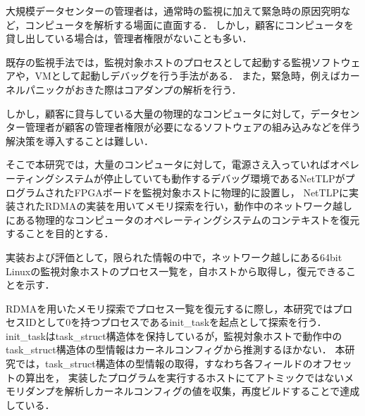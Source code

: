 \begin{jabstract}

大規模データセンターの管理者は，通常時の監視に加えて緊急時の原因究明など，コンピュータを解析する場面に直面する．
しかし，顧客にコンピュータを貸し出している場合は，管理者権限がないことも多い．

既存の監視手法では，監視対象ホストのプロセスとして起動する監視ソフトウェアや，VMとして起動しデバッグを行う手法がある．
また，緊急時，例えばカーネルパニックがおきた際はコアダンプの解析を行う．

しかし，顧客に貸与している大量の物理的なコンピュータに対して，データセンター管理者が顧客の管理者権限が必要になるソフトウェアの組み込みなどを伴う解決策を導入することは難しい．

そこで本研究では，大量のコンピュータに対して，電源さえ入っていればオペレーティングシステムが停止していても動作するデバッグ環境であるNetTLPがプログラムされたFPGAボードを監視対象ホストに物理的に設置し，
NetTLPに実装されたRDMAの実装を用いてメモリ探索を行い，動作中のネットワーク越しにある物理的なコンピュータのオペレーティングシステムのコンテキストを復元することを目的とする．

実装および評価として，限られた情報の中で，ネットワーク越しにある64bit Linuxの監視対象ホストのプロセス一覧を，自ホストから取得し，復元できることを示す．

RDMAを用いたメモリ探索でプロセス一覧を復元するに際し，本研究ではプロセスIDとして0を持つプロセスであるinit\_taskを起点として探索を行う．
init\_taskはtask\_struct構造体を保持しているが，監視対象ホストで動作中のtask\_struct構造体の型情報はカーネルコンフィグから推測するほかない．
本研究では，task\_struct構造体の型情報の取得，すなわち各フィールドのオフセットの算出を，
実装したプログラムを実行するホストにてアトミックではないメモリダンプを解析しカーネルコンフィグの値を収集，再度ビルドすることで達成している．

\end{jabstract}
